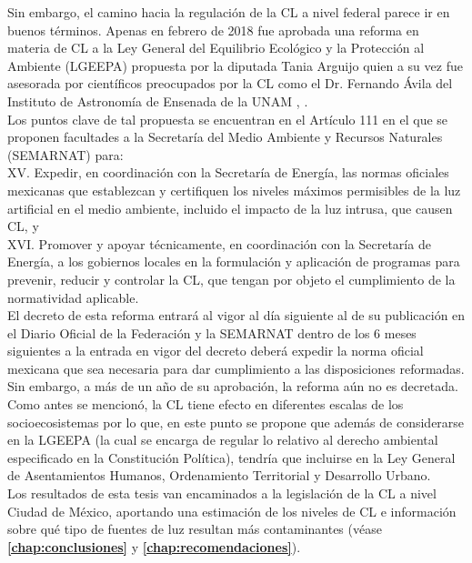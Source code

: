 Sin embargo, el camino hacia la regulación de la CL a nivel federal parece ir en buenos términos. Apenas en febrero de 2018 fue aprobada una reforma en materia de CL a la Ley General del Equilibrio Ecológico y la Protección al Ambiente (LGEEPA) propuesta por  la diputada Tania Arguijo quien a su vez fue asesorada por científicos preocupados por la CL como el Dr. Fernando Ávila del Instituto de Astronomía de Ensenada de la UNAM \citep{Arguijo2018}, \citep{LGEEPA2018}.\\

Los puntos clave de tal propuesta se encuentran en el Artículo 111 en el que se proponen facultades a la Secretaría del Medio Ambiente y Recursos Naturales (SEMARNAT) para:\\

XV. Expedir, en coordinación con la Secretaría de Energía, las normas oficiales mexicanas que establezcan y certifiquen los niveles máximos permisibles de la luz artificial en el medio ambiente, incluido el impacto de la luz intrusa, que causen CL, y\\

XVI. Promover y apoyar técnicamente, en coordinación con la Secretaría de Energía, a los gobiernos locales en la formulación y aplicación de programas para prevenir, reducir y controlar la CL, que tengan por objeto el cumplimiento de la normatividad aplicable.\\

El decreto de esta reforma entrará al vigor al día siguiente al de su publicación en el Diario Oficial de la Federación y la SEMARNAT dentro de los 6 meses siguientes a la entrada en vigor del decreto deberá expedir la norma oficial mexicana que sea necesaria para dar cumplimiento a las disposiciones reformadas. Sin embargo, a más de un año de su aprobación, la reforma aún no es decretada.\\


Como antes se mencionó, la CL tiene efecto en diferentes escalas de los socioecosistemas por lo que, en este punto se propone que además de considerarse en la LGEEPA (la cual se encarga de regular lo relativo al derecho ambiental especificado en la Constitución Política), tendría que incluirse en la Ley General de Asentamientos Humanos, Ordenamiento Territorial y Desarrollo Urbano.\\

Los resultados de esta tesis van encaminados a la legislación de la CL a nivel Ciudad de México, aportando una estimación de los niveles de CL e información sobre qué tipo de fuentes de luz resultan más contaminantes (véase \textbf{\autoref{chap:conclusiones}} y \textbf{\autoref{chap:recomendaciones}}).

